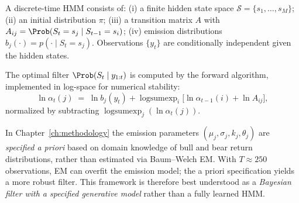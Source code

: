 \begin{definition}
\label{def:hmm}
A discrete-time HMM consists of:
(i) a finite hidden state space $\mathcal{S} = \{s_1,\ldots,s_M\}$;
(ii) an initial distribution $\pi$;
(iii) a transition matrix $A$ with $A_{ij} = \Prob(S_t=s_j \mid S_{t-1}=s_i)$;
(iv) emission distributions $b_j(\cdot) = p(\cdot \mid S_t=s_j)$.
Observations $\{y_t\}$ are conditionally independent given the hidden states.
\end{definition}

The optimal filter $\Prob(S_t \mid y_{1:t})$ is computed by the forward
algorithm, implemented in log-space for numerical stability:
\begin{equation}
    \ln\alpha_t(j) \;=\; \ln b_j(y_t)
    + \operatorname{logsumexp}_i\!\bigl[\ln\alpha_{t-1}(i)+\ln A_{ij}\bigr],
    \label{eq:forward_logspace}
\end{equation}
normalized by subtracting $\operatorname{logsumexp}_j(\ln\alpha_t(j))$.

\begin{remark}
\label{rem:hmm_specified}
In Chapter~\ref{ch:methodology} the emission parameters
$(\mu_j,\sigma_j,k_j,\theta_j)$ are \emph{specified a priori} based on domain
knowledge of bull and bear return distributions, rather than estimated via
Baum--Welch EM.  With $T\approx 250$ observations, EM can overfit the emission
model; the a priori specification yields a more robust filter.  This framework
is therefore best understood as a \emph{Bayesian filter with a specified
generative model} rather than a fully learned HMM.
\end{remark}
